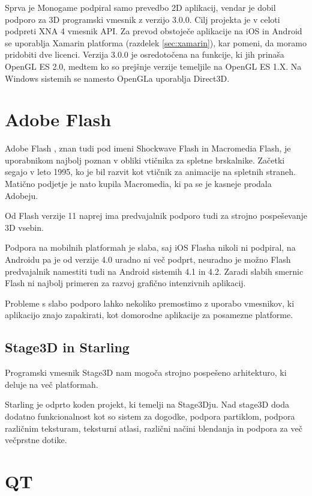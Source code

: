 Sprva je Monogame podpiral samo prevedbo 2D aplikacij, vendar je dobil podporo za 3D programski vmesnik z verzijo 3.0.0. Cilj projekta je v celoti podpreti XNA 4 vmesnik API. Za prevod obstoječe aplikacije na iOS in Android se uporablja Xamarin platforma (razdelek \ref{sec:xamarin}), kar pomeni, da moramo pridobiti dve licenci. Verzija 3.0.0 je osredotočena na funkcije, ki jih prinaša OpenGL ES 2.0, medtem ko so prejšnje verzije temeljile na OpenGL ES 1.X. Na Windows sistemih se namesto OpenGLa uporablja Direct3D.

\section{Adobe Flash}

Adobe Flash \cite{flash}, znan tudi pod imeni Shockwave Flash in Macromedia Flash, je uporabnikom najbolj poznan v obliki vtičnika za spletne brskalnike. Začetki segajo v leto 1995, ko je bil razvit kot vtičnik za animacije na spletnih straneh. Matično podjetje je nato kupila Macromedia, ki pa se je kasneje prodala Adobeju.   

Od Flash verzije 11 naprej ima predvajalnik podporo tudi za strojno pospeševanje 3D vsebin.

Podpora na mobilnih platformah je slaba, saj iOS Flasha nikoli ni podpiral, na Androidu pa je od verzije 4.0 uradno ni več podprt, neuradno je možno Flash predvajalnik namestiti tudi na Android sistemih 4.1 in 4.2. Zaradi slabih smernic Flash ni najbolj primeren za razvoj grafično intenzivnih aplikacij.

Probleme s slabo podporo lahko nekoliko premostimo z uporabo vmesnikov, ki aplikacijo znajo zapakirati, kot domorodne aplikacije za posamezne platforme.

\subsection{Stage3D in Starling}

Programski vmesnik Stage3D nam mogoča strojno pospešeno arhitekturo, ki deluje na več platformah. 

Starling je odprto koden projekt, ki temelji na Stage3Dju. Nad stage3D doda dodatno funkcionalnost kot so sistem za dogodke, podpora partiklom, podpora različnim teksturam, teksturni atlasi, različni načini blendanja in podpora za več večprstne dotike.

\section{QT}
\label{sec:qt}

